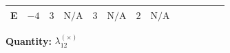 \documentclass[8pt]{article}
\begin{document}
\begin{landscape}
\begin{longtable}{@{}llcccccc >{\raggedright\arraybackslash}p{0.21\linewidth} >{\raggedright\arraybackslash}p{0.21\linewidth} >{\raggedright\arraybackslash}p{0.21\linewidth}@{}}
\midrule
E & $-4$ & $3$ & $\text{N/A}$ & $3$ & $\text{N/A}$ & $2$ & $\text{N/A}$ & \scriptsize\adjustbox{max width=\linewidth}{$\begin{gathered} -24 {g_2}^2 {\lambda_{12}^{(\times)}}\end{gathered}$} & \scriptsize\adjustbox{max width=\linewidth}{$\begin{gathered} -30 {g_1}^2 {\lambda_{12}^{(\times)}}\end{gathered}$} & \scriptsize\adjustbox{max width=\linewidth}{$\begin{gathered} +8 {\lambda_{12}^{(1)}} {\lambda_{12}^{(\times)}}\end{gathered}$} \\
\midrule
\bottomrule
\end{longtable}
\clearpage
\noindent\textbf{Quantity: }$\lambda_{12}^{(\times)}$\par\smallskip

\end{landscape}
\end{document}
